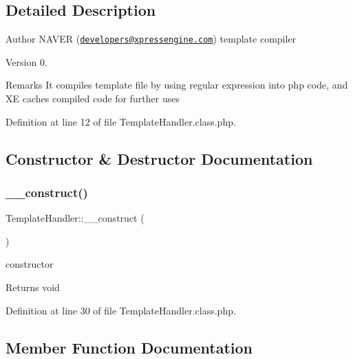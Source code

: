 \subsection{Detailed Description}
\begin{DoxyAuthor}{Author}
N\+A\+V\+ER (\href{mailto:developers@xpressengine.com}{\tt developers@xpressengine.\+com}) template compiler 
\end{DoxyAuthor}
\begin{DoxyVersion}{Version}
0. 
\end{DoxyVersion}
\begin{DoxyRemark}{Remarks}
It compiles template file by using regular expression into php code, and XE caches compiled code for further uses 
\end{DoxyRemark}


Definition at line 12 of file Template\+Handler.\+class.\+php.



\subsection{Constructor \& Destructor Documentation}
\hypertarget{classTemplateHandler_ab113c65769e65c4fe531c4cf41655f1d}{}\label{classTemplateHandler_ab113c65769e65c4fe531c4cf41655f1d} 
\subsubsection{\texorpdfstring{\+\_\+\+\_\+construct()}{\_\_construct()}}
{\footnotesize\ttfamily Template\+Handler\+::\+\_\+\+\_\+construct (\begin{DoxyParamCaption}{ }\end{DoxyParamCaption})}

constructor \begin{DoxyReturn}{Returns}
void 
\end{DoxyReturn}


Definition at line 30 of file Template\+Handler.\+class.\+php.



\subsection{Member Function Documentation}
\hypertarget{classTemplateHandler_a6d8e3da7128be8bded89dc9edc4a1bc8}{}\label{classTemplateHandler_a6d8e3da7128be8bded89dc9edc4a1bc8} 
